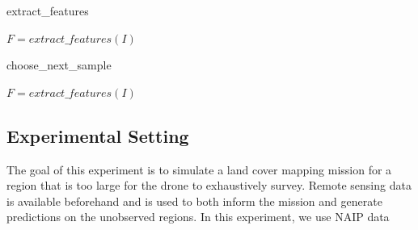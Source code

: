 \begin{algorithm}
\caption{extract\_features}\label{alg:methods:extract_features}
\begin{algorithmic}
\State $F = extract\_features(I)$
\end{algorithmic}
\end{algorithm}

\begin{algorithm}
\caption{choose\_next\_sample}\label{alg:methods:choose_next_sample}
\begin{algorithmic}
\State $F = extract\_features(I)$
\end{algorithmic}
\end{algorithm}




\subsection{Experimental Setting}
The goal of this experiment is to simulate a land cover mapping mission for a region that is too large for the drone to exhaustively survey. Remote sensing data is available beforehand and is used to both inform the mission and generate predictions on the unobserved regions. In this experiment, we use NAIP \cite{} data 






